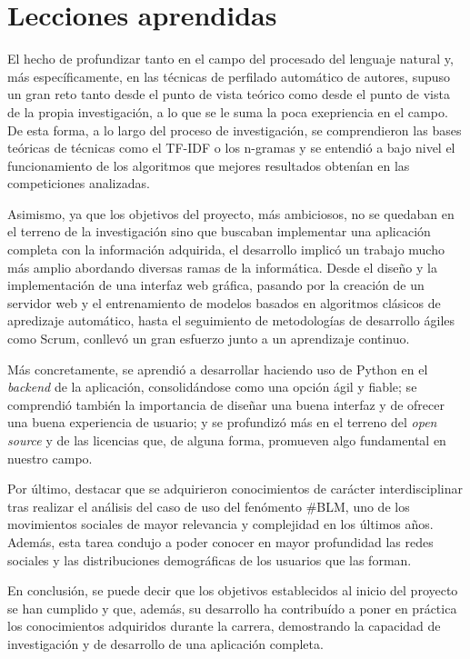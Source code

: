 \section{Lecciones aprendidas}
\label{sec:lecciones_aprendidas}

El hecho de profundizar tanto en el campo del procesado del lenguaje natural y, más específicamente,
en las técnicas de perfilado automático de autores, supuso un gran reto tanto desde el punto de vista teórico como
desde el punto de vista de la propia investigación, a lo que se le suma la poca exepriencia en el campo. De esta forma, a lo largo del
proceso de investigación, se comprendieron las bases teóricas de técnicas como el TF-IDF o los n-gramas y se entendió a
bajo nivel el funcionamiento de los algoritmos que mejores resultados obtenían en las competiciones analizadas.

\bigskip
Asimismo, ya que los objetivos del proyecto, más ambiciosos, no se quedaban en el terreno de la investigación
sino que buscaban implementar una aplicación completa con la información adquirida, el desarrollo implicó un trabajo
mucho más amplio abordando diversas ramas de la informática. Desde el diseño y la implementación de una interfaz web gráfica,
pasando por la creación de un servidor web y el entrenamiento de modelos basados en algoritmos clásicos
de apredizaje automático, hasta el seguimiento de metodologías de desarrollo ágiles como Scrum, conllevó
un gran esfuerzo junto a un aprendizaje continuo.

\bigskip
Más concretamente, se aprendió a desarrollar haciendo uso de Python en el \textit{backend} de la aplicación, consolidándose
como una opción ágil y fiable; se comprendió también la importancia de diseñar una buena interfaz
y de ofrecer una buena experiencia de usuario; y se profundizó más en el terreno del \textit{open source} y de las licencias
que, de alguna forma, promueven algo fundamental en nuestro campo.

\bigskip
Por último, destacar que se adquirieron conocimientos de carácter interdisciplinar tras realizar el análisis del caso de uso del fenómento \#BLM,
uno de los movimientos sociales de mayor relevancia y complejidad en los últimos años. Además, esta tarea condujo
a poder conocer en mayor profundidad las redes sociales y las distribuciones demográficas
de los usuarios que las forman.

\bigskip
En conclusión, se puede decir que los objetivos establecidos al inicio del proyecto se han cumplido y que,
además, su desarrollo ha contribuído a poner en práctica los conocimientos adquiridos durante la carrera,
demostrando la capacidad de investigación y de desarrollo de una aplicación completa.
